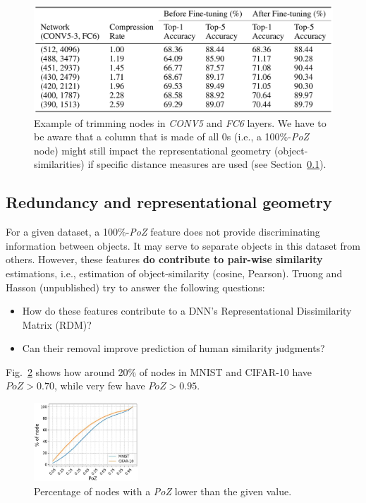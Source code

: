 \begin{figure}[!ht]
    \centering
    \captionsetup{width=.8\linewidth}
    \includegraphics[width=0.65\linewidth]{images/trimming.png}
    \caption*{Example of trimming nodes in \textit{CONV5} and \textit{FC6} layers. We have to be aware that a column that is made of all 0s (i.e., a 100\%-\textit{PoZ} node) might still impact the representational geometry (object-similarities) if specific distance measures are used (see Section~\ref{sec:redundancy}).}
    \label{fig:trimming}
\end{figure}

\subsection{Redundancy and representational geometry}
\label{sec:redundancy}
For a given dataset, a 100\%-\textit{PoZ} feature does not provide discriminating information between objects. It may  serve to separate objects in this dataset from others. However, these features \textbf{do contribute to pair-wise similarity} estimations, i.e., estimation of object-similarity (cosine, Pearson).
Truong and Hasson (unpublished) try to answer the following questions:
\begin{itemize}
    \item How do these features contribute to a DNN's  Representational Dissimilarity Matrix (RDM)? 
    \item Can their removal improve prediction of human similarity judgments?
\end{itemize}

Fig.~\ref{fig:poz} shows how around 20\% of nodes in MNIST and CIFAR-10 have $PoZ>0.70$, while very few have $PoZ>0.95$.\\

\begin{figure}
  \centering
  \includegraphics[width=0.35\textwidth]{images/poz.png}
  \caption{Percentage of nodes with a \textit{PoZ} lower than the given value.}
  \label{fig:poz}
\end{figure}


